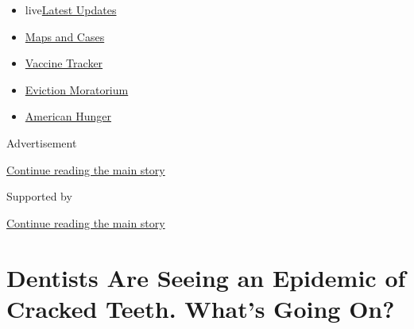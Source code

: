 \begin{itemize}
\tightlist
\item
  live\href{https://www.nytimes3xbfgragh.onion/2020/09/08/world/covid-19-coronavirus.html?name=styln-coronavirus-national\&region=TOP_BANNER\&block=storyline_menu_recirc\&action=click\&pgtype=Article\&impression_id=72050c81-f1f0-11ea-a7d5-df0e27ecb6dd\&variant=undefined}{Latest
  Updates}
\item
  \href{https://www.nytimes3xbfgragh.onion/interactive/2020/us/coronavirus-us-cases.html?name=styln-coronavirus-national\&region=TOP_BANNER\&block=storyline_menu_recirc\&action=click\&pgtype=Article\&impression_id=72050c82-f1f0-11ea-a7d5-df0e27ecb6dd\&variant=undefined}{Maps
  and Cases}
\item
  \href{https://www.nytimes3xbfgragh.onion/interactive/2020/science/coronavirus-vaccine-tracker.html?name=styln-coronavirus-national\&region=TOP_BANNER\&block=storyline_menu_recirc\&action=click\&pgtype=Article\&impression_id=72053390-f1f0-11ea-a7d5-df0e27ecb6dd\&variant=undefined}{Vaccine
  Tracker}
\item
  \href{https://www.nytimes3xbfgragh.onion/2020/09/02/your-money/eviction-moratorium-covid.html?name=styln-coronavirus-national\&region=TOP_BANNER\&block=storyline_menu_recirc\&action=click\&pgtype=Article\&impression_id=72053391-f1f0-11ea-a7d5-df0e27ecb6dd\&variant=undefined}{Eviction
  Moratorium}
\item
  \href{https://www.nytimes3xbfgragh.onion/interactive/2020/09/02/magazine/food-insecurity-hunger-us.html?name=styln-coronavirus-national\&region=TOP_BANNER\&block=storyline_menu_recirc\&action=click\&pgtype=Article\&impression_id=72053392-f1f0-11ea-a7d5-df0e27ecb6dd\&variant=undefined}{American
  Hunger}
\end{itemize}

Advertisement

\protect\hyperlink{after-top}{Continue reading the main story}

Supported by

\protect\hyperlink{after-sponsor}{Continue reading the main story}

\hypertarget{dentists-are-seeing-an-epidemic-of-cracked-teeth-whats-going-on}{%
\section{Dentists Are Seeing an Epidemic of Cracked Teeth. What's Going
On?}\label{dentists-are-seeing-an-epidemic-of-cracked-teeth-whats-going-on}}

